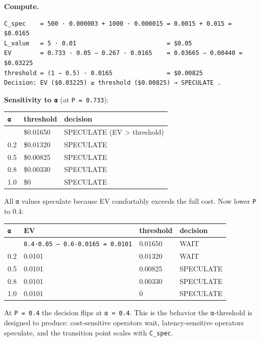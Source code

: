 \documentclass[
  11pt,
]{article}
\newcounter{none} %
\begin{document}
\textbf{Compute.}

\begin{verbatim}
C_spec    = 500 · 0.000003 + 1000 · 0.000015 = 0.0015 + 0.015 = $0.0165
L_value   = 5 · 0.01                         = $0.05
EV        = 0.733 · 0.05 − 0.267 · 0.0165    = 0.03665 − 0.00440 = $0.03225
threshold = (1 − 0.5) · 0.0165               = $0.00825
Decision: EV ($0.03225) ≥ threshold ($0.00825) → SPECULATE .
\end{verbatim}

\textbf{Sensitivity to \texttt{α}} (at \texttt{P\ =\ 0.733}):

{\def\LTcaptype{none} %
\begin{longtable}[]{@{}lll@{}}
\toprule\noalign{}
\texttt{α} & threshold & decision \\
\midrule\noalign{}
\endhead
\bottomrule\noalign{}
\endlastfoot
0 & \$0.01650 & SPECULATE (EV \textgreater{} threshold) \\
0.2 & \$0.01320 & SPECULATE \\
0.5 & \$0.00825 & SPECULATE \\
0.8 & \$0.00330 & SPECULATE \\
1.0 & \$0 & SPECULATE \\
\end{longtable}
}

All \texttt{α} values speculate because EV comfortably exceeds the full
cost. Now lower \texttt{P} to 0.4:

{\def\LTcaptype{none} %
\begin{longtable}[]{@{}llll@{}}
\toprule\noalign{}
\texttt{α} & EV & threshold & decision \\
\midrule\noalign{}
\endhead
\bottomrule\noalign{}
\endlastfoot
0 & \texttt{0.4·0.05\ −\ 0.6·0.0165\ =\ 0.0101} & 0.01650 & WAIT \\
0.2 & 0.0101 & 0.01320 & WAIT \\
0.5 & 0.0101 & 0.00825 & SPECULATE \\
0.8 & 0.0101 & 0.00330 & SPECULATE \\
1.0 & 0.0101 & 0 & SPECULATE \\
\end{longtable}
}

At \texttt{P\ =\ 0.4} the decision flips at \texttt{α\ ≈\ 0.4}. This is
the behavior the \texttt{α}-threshold is designed to produce:
cost-sensitive operators wait, latency-sensitive operators speculate,
and the transition point scales with \texttt{C\_spec}.
\end{document}
